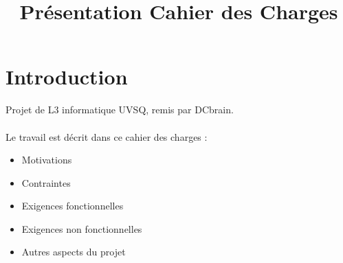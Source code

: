 
\usepackage{../tex/myInfolines}
\title{Présentation Cahier des Charges}



	\begin{frame}
		\titlepage
	\end{frame}
	
	\section{Introduction}
	\begin{frame}
		Projet de L3 informatique UVSQ, remis par DCbrain.\\~\\
		Le travail est décrit dans ce cahier des charges :
		\begin{itemize}
			\item Motivations
			\item Contraintes
			\item Exigences fonctionnelles
			\item Exigences non fonctionnelles
			\item Autres aspects du projet
		\end{itemize}
	\end{frame}
	
